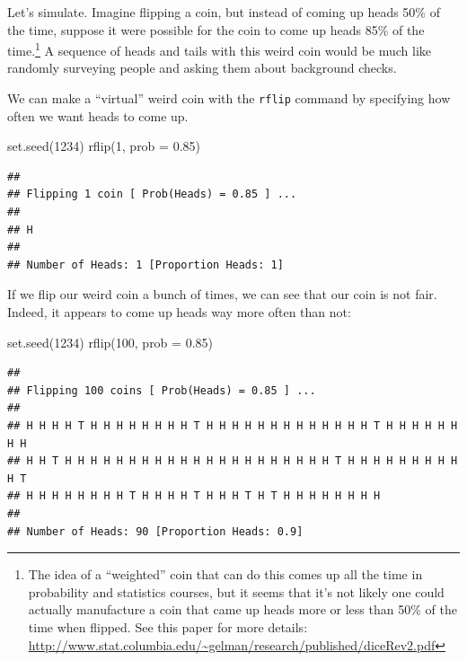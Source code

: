 \documentclass[
]{book}
\newenvironment{Shaded}{\begin{snugshade}}{\end{snugshade}}
\newcommand{\AttributeTok}[1]{\textcolor[rgb]{0.77,0.63,0.00}{#1}}
\newcommand{\DecValTok}[1]{\textcolor[rgb]{0.00,0.00,0.81}{#1}}
\newcommand{\FloatTok}[1]{\textcolor[rgb]{0.00,0.00,0.81}{#1}}
\newcommand{\FunctionTok}[1]{\textcolor[rgb]{0.00,0.00,0.00}{#1}}
\newcommand{\NormalTok}[1]{#1}
\begin{document}
Let's simulate. Imagine flipping a coin, but instead of coming up heads 50\% of the time, suppose it were possible for the coin to come up heads 85\% of the time.\footnote{The idea of a ``weighted'' coin that can do this comes up all the time in probability and statistics courses, but it seems that it's not likely one could actually manufacture a coin that came up heads more or less than 50\% of the time when flipped. See this paper for more details: \url{http://www.stat.columbia.edu/~gelman/research/published/diceRev2.pdf}} A sequence of heads and tails with this weird coin would be much like randomly surveying people and asking them about background checks.

We can make a ``virtual'' weird coin with the \texttt{rflip} command by specifying how often we want heads to come up.

\begin{Shaded}
\begin{Highlighting}[]
\FunctionTok{set.seed}\NormalTok{(}\DecValTok{1234}\NormalTok{)}
\FunctionTok{rflip}\NormalTok{(}\DecValTok{1}\NormalTok{, }\AttributeTok{prob =} \FloatTok{0.85}\NormalTok{)}
\end{Highlighting}
\end{Shaded}

\begin{verbatim}
## 
## Flipping 1 coin [ Prob(Heads) = 0.85 ] ...
## 
## H
## 
## Number of Heads: 1 [Proportion Heads: 1]
\end{verbatim}

If we flip our weird coin a bunch of times, we can see that our coin is not fair. Indeed, it appears to come up heads way more often than not:

\begin{Shaded}
\begin{Highlighting}[]
\FunctionTok{set.seed}\NormalTok{(}\DecValTok{1234}\NormalTok{)}
\FunctionTok{rflip}\NormalTok{(}\DecValTok{100}\NormalTok{, }\AttributeTok{prob =} \FloatTok{0.85}\NormalTok{)}
\end{Highlighting}
\end{Shaded}

\begin{verbatim}
## 
## Flipping 100 coins [ Prob(Heads) = 0.85 ] ...
## 
## H H H H T H H H H H H H H T H H H H H H H H H H H H H T H H H H H H H H
## H H T H H H H H H H H H H H H H H H H H H H H H T H H H H H H H H H H T
## H H H H H H H H T H H H H T H H H T H T H H H H H H H H
## 
## Number of Heads: 90 [Proportion Heads: 0.9]
\end{verbatim}
\end{document}
